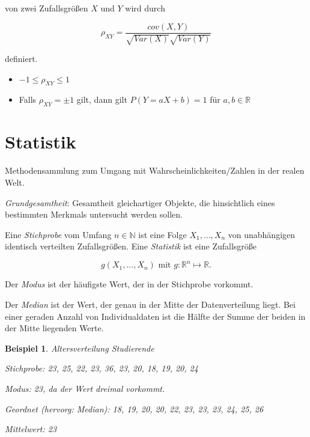 \documentclass{tufte-handout}
\theoremstyle{own}
\newtheorem{example}{Beispiel}[]
\begin{document}
 von zwei Zufallsgrößen $X$ und $Y$ wird
durch

\begin{equation}
	\rho_{XY} = \frac{cov(X,Y)}{\sqrt{Var(X)}\sqrt{Var(Y)}}
\end{equation}

definiert.

\begin{itemize}
\item $ -1 \leq \rho_{XY} \leq 1 $
\item Falls $\rho_{XY} = \pm 1$ gilt, dann gilt $P(Y = aX + b) = 1$ für $a,b \in \mathbb{R}$
\end{itemize}

\section{Statistik}

Methodensammlung zum Umgang mit Wahrscheinlichkeiten/Zahlen in der realen Welt.

\emph{Grundgesamtheit}: Gesamtheit gleichartiger Objekte, die hinsichtlich eines
bestimmten Merkmals untersucht werden sollen.

Eine \emph{Stichprobe} vom Umfang $n \in \mathbb{N}$ ist eine Folge $X_1,...,X_n$ von
unabhängigen identisch verteilten Zufallsgrößen. Eine \emph{Statistik} ist eine
Zufallsgröße

\begin{equation}
	g(X_1,...,X_n) \text{ mit } g: \mathbb{R}^n \mapsto \mathbb{R}.
\end{equation}

Der \emph{Modus} ist der häufigste Wert, der in der Stichprobe vorkommt.

Der \emph{Median} ist der Wert, der genau in der Mitte der Datenverteilung liegt.
Bei einer geraden Anzahl von Individualdaten ist die Hälfte der Summe der beiden
in der Mitte liegenden Werte.

\begin{example} Altersverteilung Studierende

Stichprobe: 23, 25, 22, 23, 36, 23, 20, 18, 19, 20, 24

Modus: 23, da der Wert dreimal vorkommt.

Geordnet (hervorg: Median): 18, 19, 20, 20, 22, \emph{23}, 23, 23, 24, 25, 26

Mittelwert: 23

\end{example}
\end{document}
